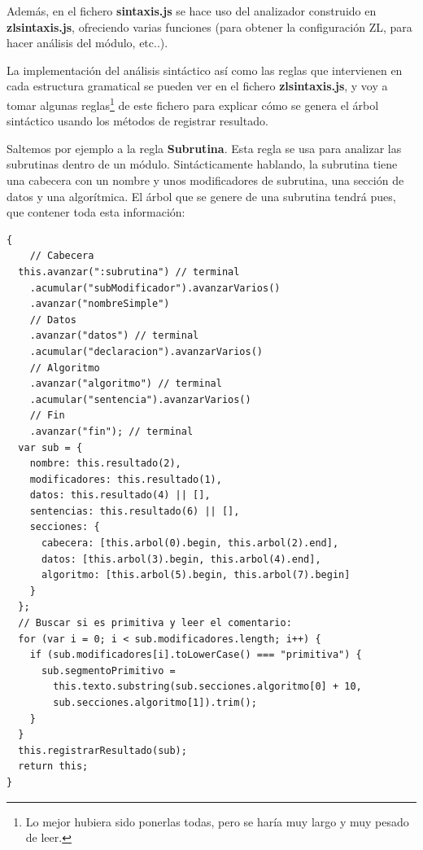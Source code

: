 \documentclass{report}
\begin{document}
	\vspace{10px}
	
	Además, en el fichero \textbf{sintaxis.js} se hace uso del analizador construido en \textbf{zlsintaxis.js}, ofreciendo varias funciones (para obtener la configuración ZL, para hacer análisis del módulo, etc..).
	
	\vspace{10px}
	
	
	La implementación del análisis sintáctico así como las reglas que intervienen en cada estructura gramatical se pueden ver en el fichero \textbf{zlsintaxis.js}, y voy a tomar algunas reglas\footnote{Lo mejor hubiera sido ponerlas todas, pero se haría muy largo y muy pesado de leer.} de este fichero para explicar cómo se genera el árbol sintáctico usando los métodos de registrar resultado.
	
	\vspace{10px}
	
	Saltemos por ejemplo a la regla \textbf{Subrutina}. Esta regla se usa para analizar las subrutinas dentro de un módulo. Sintácticamente hablando, la subrutina tiene una cabecera con un nombre y unos modificadores de subrutina, una sección de datos y una algorítmica. El árbol que se genere de una subrutina tendrá pues, que contener toda esta información:
	
\begin{BVerbatim}
{
    // Cabecera
  this.avanzar(":subrutina") // terminal
    .acumular("subModificador").avanzarVarios()
    .avanzar("nombreSimple")
    // Datos
    .avanzar("datos") // terminal
    .acumular("declaracion").avanzarVarios()
    // Algoritmo
    .avanzar("algoritmo") // terminal
    .acumular("sentencia").avanzarVarios()
    // Fin
    .avanzar("fin"); // terminal
  var sub = {
    nombre: this.resultado(2),
    modificadores: this.resultado(1),
    datos: this.resultado(4) || [],
    sentencias: this.resultado(6) || [],
    secciones: {
      cabecera: [this.arbol(0).begin, this.arbol(2).end],
      datos: [this.arbol(3).begin, this.arbol(4).end],
      algoritmo: [this.arbol(5).begin, this.arbol(7).begin]
    }
  };
  // Buscar si es primitiva y leer el comentario:
  for (var i = 0; i < sub.modificadores.length; i++) {
    if (sub.modificadores[i].toLowerCase() === "primitiva") {
      sub.segmentoPrimitivo = 
        this.texto.substring(sub.secciones.algoritmo[0] + 10, 
        sub.secciones.algoritmo[1]).trim();
    }
  }
  this.registrarResultado(sub);
  return this;
}
\end{BVerbatim}
\end{document}
